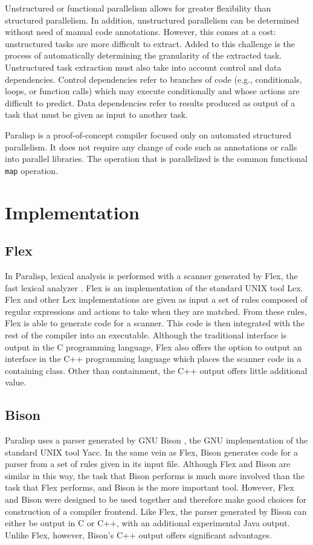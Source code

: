 \documentclass[abstracton]{scrartcl}
\begin{document}
Unstructured or functional parallelism allows for greater flexibility than structured parallelism. In addition, unstructured parallelism can be determined without need of manual code annotations. However, this comes at a cost: unstructured tasks are more difficult to extract. Added to this challenge is the process of automatically determining the granularity of the extracted task. Unstructured task extraction must also take into account control and data dependencies. Control dependencies refer to branches of code (e.g., conditionals, loops, or function calls) which may execute conditionally and whose actions are difficult to predict. Data dependencies refer to results produced as output of a task that must be given as input to another task.

Paralisp is a proof-of-concept compiler focused only on automated structured parallelism. It does not require any change of code such as annotations or calls into parallel libraries. The operation that is parallelized is the common functional \verb|map| operation.

\section{Implementation}

\subsection{Flex}

In Paralisp, lexical analysis is performed with a scanner generated by Flex, the fast lexical analyzer \autocite{flex}. Flex is an implementation of the standard UNIX tool Lex\@. Flex and other Lex implementations are given as input a set of rules composed of regular expressions and actions to take when they are matched. From these rules, Flex is able to generate code for a scanner. This code is then integrated with the rest of the compiler into an executable. Although the traditional interface is output in the C programming language, Flex also offers the option to output an interface in the C++ programming language which places the scanner code in a containing class. Other than containment, the C++ output offers little additional value.

\subsection{Bison}

Paralisp uses a parser generated by GNU Bison \autocite{bison}, the GNU implementation of the standard UNIX tool Yacc. In the same vein as Flex, Bison generates code for a parser from a set of rules given in its input file. Although Flex and Bison are similar in this way, the task that Bison performs is much more involved than the task that Flex performs, and Bison is the more important tool. However, Flex and Bison were designed to be used together and therefore make good choices for construction of a compiler frontend. Like Flex, the parser generated by Bison can either be output in C or C++, with an additional experimental Java output. Unlike Flex, however, Bison's C++ output offers significant advantages.
\end{document}
